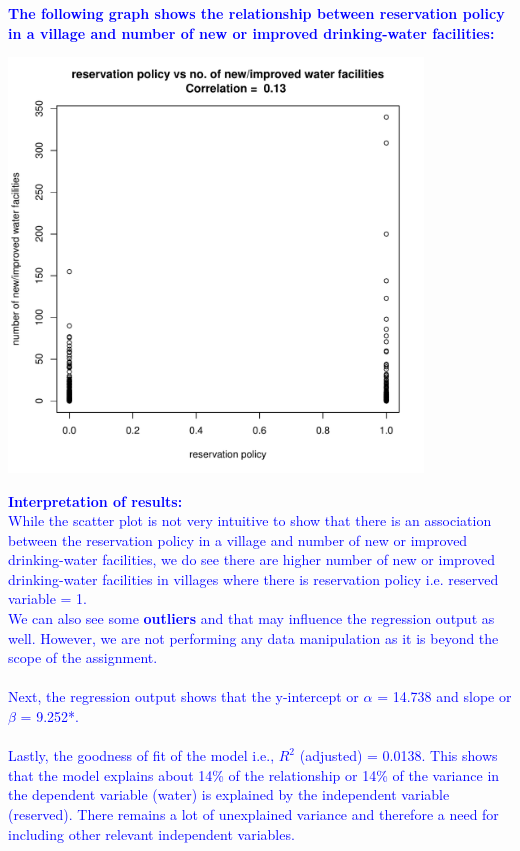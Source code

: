 \documentclass[12pt,letterpaper]{article}
\begin{document}
\begin{enumerate}


\textcolor{blue}{
	\noindent \textbf{The following graph shows the relationship between reservation policy in a village and number of new or improved drinking-water facilities:}
}
\begin{center}
	\includegraphics[width=11cm]{plot_Y_X.pdf}  
\end{center}


\textcolor{blue}{
	\textbf{Interpretation of results:}\\
	While the scatter plot is not very intuitive to show that there is an association between the reservation policy in a village and number of new or improved drinking-water facilities, we do see there are higher number of new or improved drinking-water facilities in villages where there is reservation policy i.e. reserved variable = 1.\\
	We can also see some \textbf{outliers} and that may influence the regression output as well. However, we are not performing any data manipulation as it is beyond the scope of the assignment.\\
	\\Next, the regression output shows that the y-intercept or $\alpha$ = 14.738 and slope or $\beta$ = 9.252*.\\
	\\Lastly, the goodness of fit of the model i.e., $R^2$ (adjusted) = 0.0138. This shows that the model explains about 14\% of the relationship or 14\% of the variance in the dependent variable (water) is explained by the independent variable (reserved). There remains a lot of unexplained variance and therefore a need for including other relevant independent variables. 
}
	

\end{enumerate}
\end{document}
